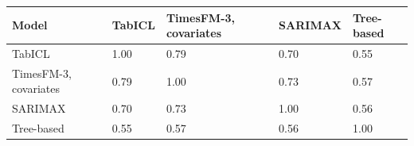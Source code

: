 \begin{tabular}{lllll}
\toprule
Model & TabICL & TimesFM-3, covariates & SARIMAX & Tree-based \\
\midrule
TabICL & 1.00 & 0.79 & 0.70 & 0.55 \\
TimesFM-3, covariates & 0.79 & 1.00 & 0.73 & 0.57 \\
SARIMAX & 0.70 & 0.73 & 1.00 & 0.56 \\
Tree-based & 0.55 & 0.57 & 0.56 & 1.00 \\
\bottomrule
\end{tabular}
